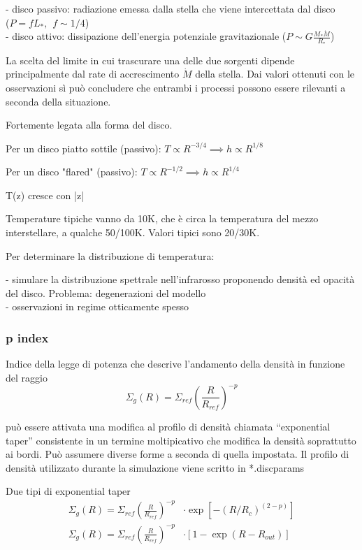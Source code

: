 \documentclass[DIN, pagenumber=false, fontsize=11pt, parskip=half]{scrartcl}
\begin{document}
- disco passivo: radiazione emessa dalla stella che viene intercettata dal disco \\($P=fL_*, \hspace{5pt} f\sim 1/4$) \\
- disco attivo: dissipazione dell'energia potenziale gravitazionale ($P \sim 
G \frac{M_*\dot{M}}{R_*}$)

La scelta del limite in cui trascurare una delle due sorgenti dipende principalmente dal rate di accrescimento $\dot{M}$  della stella. Dai valori ottenuti con le osservazioni sì può concludere che entrambi i processi possono essere rilevanti a seconda della situazione.

Fortemente legata alla forma del disco.

Per un disco piatto sottile (passivo): $T \propto R^{-3/4} \implies h \propto R^{1/8}$

Per un disco "flared" (passivo): $T \propto R^{-1/2} \implies h \propto R^{1/4}$ 

T(z) cresce con |z|

Temperature tipiche vanno da 10K, che è circa la temperatura del mezzo interstellare, a qualche 50/100K. Valori tipici sono 20/30K.

Per determinare la distribuzione di temperatura:

- simulare la distribuzione spettrale nell'infrarosso proponendo densità ed opacità del disco. Problema: degenerazioni del modello\\
- osservazioni in regime otticamente spesso

\subsubsection{p index}
\label{pind}
Indice della legge di potenza che descrive l'andamento della densità in funzione del raggio
\begin{equation}
    \Sigma_g(R) = \Sigma_{ref} \left( \frac{R}{R_{ref}}\right)^{-p}
\end{equation}

può essere attivata una modifica al profilo di densità chiamata ``exponential taper'' consistente in un termine moltipicativo che modifica la densità soprattutto ai bordi. Può assumere diverse forme a seconda di quella impostata.
Il profilo di densità utilizzato durante la simulazione viene scritto in *.discparams

Due tipi di exponential taper
\begin{align}
 \Sigma_g(R) = \Sigma_{ref} \left( \frac{R}{R_{ref}}\right)^{-p} &\cdot 
 \exp[-(R/R_c)^{(2-p)}] \\
 \Sigma_g(R) = \Sigma_{ref} \left( \frac{R}{R_{ref}}\right)^{-p} &\cdot
 [1-\exp(R-R_{out})]
\end{align}
\end{document}
